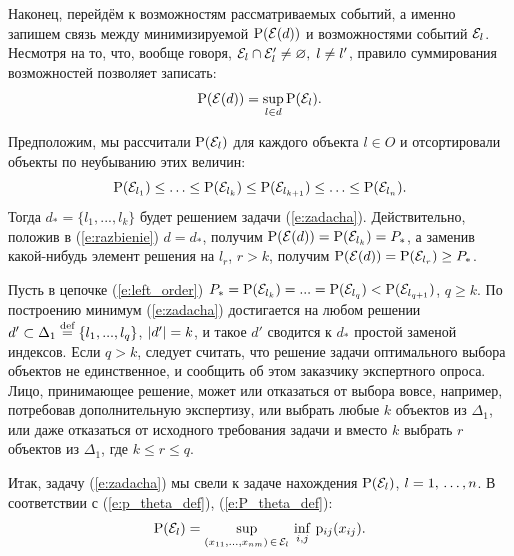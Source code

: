 Наконец, перейдём к возможностям рассматриваемых событий, а именно запишем связь между минимизируемой ${\mathrm{P}}(\mathcal{E}(d))$ и возможностями событий $\mathcal{E}_l$. Несмотря на то, что, вообще говоря, $\mathcal{E}_l \cap \mathcal{E}_l' \neq \varnothing,\; l \neq l'$, правило суммирования возможностей позволяет записать:
\begin{equation}
  \label{e:razbienie}
  {\mathrm{P}}(\mathcal{E}(d)) = \sup_{l \in d} {\mathrm{P}}(\mathcal{E}_l).
\end{equation}

Предположим, мы рассчитали  ${\mathrm{P}}(\mathcal{E}_l)$ для каждого объекта $l \in O$ и отсортировали объекты по неубыванию этих величин:
\begin{equation}
  \label{e:left_order}
  {\mathrm{P}}(\mathcal{E}_{l_1}) \leq \ldots \leq {\mathrm{P}}(\mathcal{E}_{l_k}) \leq {\mathrm{P}}(\mathcal{E}_{l_{k+1}}) \leq \ldots \leq {\mathrm{P}}(\mathcal{E}_{l_n}). 
\end{equation}
Тогда $d_* = \{l_1, ...,  l_k\}$ будет решением задачи (\ref{e:zadacha}). Действительно, положив в (\ref{e:razbienie}) $d = d_*$, получим ${\mathrm{P}}(\mathcal{E}(d)) = {\mathrm{P}}(\mathcal{E}_{l_k}) = P_*$, а заменив какой-нибудь элемент  решения на $l_r$, $r > k$, получим ${\mathrm{P}}(\mathcal{E}(d)) = {\mathrm{P}}(\mathcal{E}_{l_r}) \geq P_*$. 

\begin{notice}
Пусть в цепочке (\ref{e:left_order}) $P_* = {\mathrm{P}}(\mathcal{E}_{l_k}) = ... = {\mathrm{P}}(\mathcal{E}_{l_q}) < {\mathrm{P}}(\mathcal{E}_{l_{q+1}})$, $q \geq k$. По построению минимум (\ref{e:zadacha}) достигается на любом решении $d' \subset \Delta_1 \overset{\text{def}}{=} \{l_1, ..., l_q\}$, $\left| d' \right| = k$, и такое $d'$ сводится к $d_*$ простой заменой индексов. Если $q > k$, следует считать, что решение задачи оптимального выбора объектов не единственное, и сообщить об этом заказчику экспертного опроса. Лицо, принимающее решение, может или отказаться от выбора вовсе, например, потребовав дополнительную экспертизу, или выбрать любые $k$ объектов из $\Delta_1$, или даже отказаться от исходного требования задачи и вместо $k$ выбрать $r$ объектов из $\Delta_1$, где $k \leq r \leq q$.
\end{notice}

 Итак, задачу (\ref{e:zadacha}) мы свели к задаче нахождения ${\mathrm{P}}(\mathcal{E}_l)$, $l = 1,\, \ldots, n$. В соответствии с (\ref{e:p_theta_def}), (\ref{e:P_theta_def}):
\begin{equation}
  \label{e:pl_main}
  {\mathrm{P}}(\mathcal{E}_l) = \sup_{(x_{11}, ..., x_{nm})\,\in\,\mathcal{E}_l} \, \inf_{i, j}\,{\mathrm{p}}_{ij}(x_{ij}). 
\end{equation}

